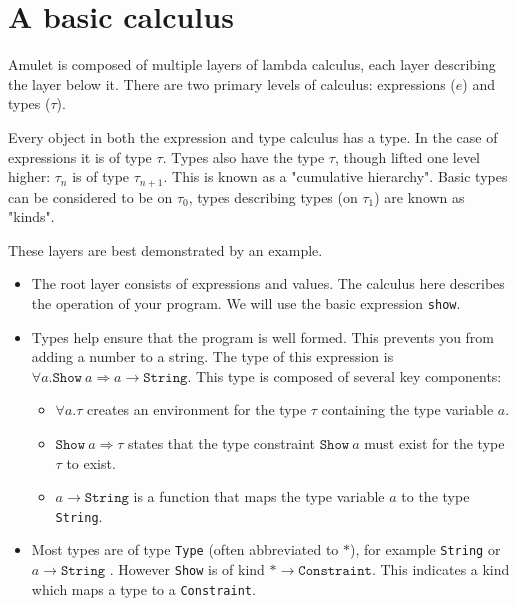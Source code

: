 \section{A basic calculus}
Amulet is composed of multiple layers of lambda calculus, each layer describing the layer below it. There are two primary levels of calculus: expressions ($e$) and types ($\tau$).

Every object in both the expression and type calculus has a type. In the case of expressions it is of type $\tau$. Types also have the type $\tau$, though lifted one level higher: $\tau_n$ is of type $\tau_{n+1}$. This is known as a "cumulative hierarchy". Basic types can be considered to be on $\tau_0$, types describing types (on $\tau_1$) are known as "kinds".

These layers are best demonstrated by an example.
\begin{itemize}
\item The root layer consists of expressions and values. The calculus here describes the operation of your program. We will use the basic expression \texttt{show}.
\item Types help ensure that the program is well formed. This prevents you from adding a number to a string. The type of this expression is $\forall a . \mathtt{Show}\ a \Rightarrow a \to \mathtt{String}$. This type is composed of several key components: 
\begin{itemize}
\item $\forall a . \tau$ creates an environment for the type $\tau$ containing the type variable $a$.
\item $\mathtt{Show}\ a \Rightarrow \tau$ states that the type constraint $\mathtt{Show}\ a$  must exist for the type $\tau$ to exist.
\item $a \rightarrow \mathtt{String}$ is a function that maps the type variable $a$ to the type \texttt{String}. 
\end{itemize}
\item Most types are of type \texttt{Type} (often abbreviated to $*$), for example \texttt{String} or $a \to \mathtt{String}$ . However \texttt{Show} is of kind $* \to\mathtt{Constraint}$. This indicates a kind which maps a type to a \texttt{Constraint}.
\end{itemize}

